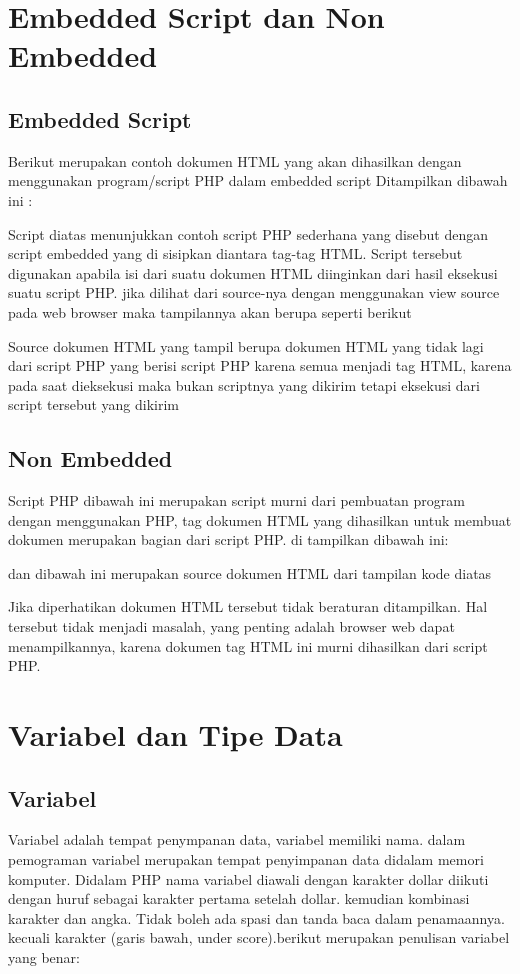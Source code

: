 \section{Embedded Script dan Non Embedded}
\subsection{Embedded Script}
  \item Berikut merupakan contoh dokumen HTML yang akan dihasilkan dengan menggunakan program/script PHP dalam embedded script
    Ditampilkan dibawah ini  :
    
Script diatas menunjukkan contoh script PHP sederhana yang disebut dengan script embedded yang di sisipkan diantara tag-tag HTML. Script tersebut digunakan apabila isi dari suatu dokumen HTML diinginkan dari hasil eksekusi suatu script PHP. jika dilihat dari source-nya dengan menggunakan view source pada web browser maka tampilannya akan berupa seperti berikut
    
Source dokumen HTML yang tampil berupa dokumen HTML yang tidak lagi dari script PHP yang berisi script PHP karena semua menjadi tag HTML, karena pada saat dieksekusi maka bukan scriptnya yang dikirim tetapi eksekusi dari script tersebut yang dikirim 
\subsection{Non Embedded}
   \item Script PHP dibawah ini merupakan script murni dari pembuatan program dengan menggunakan PHP, tag dokumen HTML yang dihasilkan untuk membuat dokumen merupakan bagian dari script PHP. di tampilkan dibawah ini:
  
dan dibawah ini merupakan source dokumen HTML dari tampilan kode diatas  
  
Jika diperhatikan dokumen HTML tersebut tidak beraturan ditampilkan. Hal tersebut tidak menjadi masalah, yang penting adalah browser web dapat menampilkannya, karena dokumen tag HTML ini murni dihasilkan dari script PHP. 
\section{Variabel dan Tipe Data}
\subsection{Variabel}
Variabel adalah tempat penympanan data, variabel memiliki nama. dalam pemograman variabel merupakan tempat penyimpanan data didalam memori komputer. Didalam PHP nama variabel diawali dengan karakter dollar diikuti dengan huruf sebagai karakter pertama setelah dollar. kemudian kombinasi karakter dan angka. Tidak boleh ada spasi dan tanda baca dalam penamaannya. kecuali karakter (garis bawah, under score).berikut merupakan penulisan variabel yang benar:

